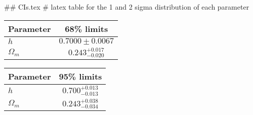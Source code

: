 ## CIs.tex
# latex table for the 1 and 2 sigma distribution of each parameter

\begin{tabular} { l  c}
 Parameter &  68\% limits\\
\hline
{\boldmath$h              $} & $0.7000\pm 0.0067          $\\
{\boldmath$\Omega_m       $} & $0.243^{+0.017}_{-0.020}   $\\
\hline
\end{tabular}

\begin{tabular} { l  c}
 Parameter &  95\% limits\\
\hline
{\boldmath$h              $} & $0.700^{+0.013}_{-0.013}   $\\
{\boldmath$\Omega_m       $} & $0.243^{+0.038}_{-0.034}   $\\
\hline
\end{tabular}

